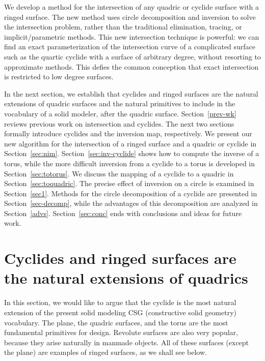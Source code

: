 We develop a method for the intersection of any quadric or cyclide surface
with a ringed surface.
The new method uses circle decomposition and inversion to solve the 
intersection problem, rather than the traditional elimination, tracing, or
implicit/parametric methods.
This new intersection technique is powerful: 
we can find an exact parameterization of the intersection curve of a
complicated surface such as the quartic cyclide 
with a surface of arbitrary degree, without resorting to approximate methods.
This defies the common conception that exact intersection is restricted to 
low degree surfaces.

In the next section, we establish that cyclides and ringed surfaces 
are the natural extensions of quadric surfaces and the natural primitives 
to include in the vocabulary of a solid modeler, after the quadric surface.
Section~\ref{prev-wk} reviews previous work on intersection and cyclides.
The next two sections formally introduce cyclides and the inversion map, 
respectively.
We present our new algorithm for the intersection of a ringed surface and 
a quadric or cyclide in Section~\ref{sec:nim}.
Section~\ref{sec:inv-cyclide} shows how to compute the inverse of a torus,
while the more difficult inversion from a cyclide to a torus is developed
in Section~\ref{sec:totorus}.
We discuss the mapping of a cyclide to a quadric in 
Section~\ref{sec:toquadric}.
The precise effect of inversion on a circle is examined in Section~\ref{sec1}.
Methods for the circle decomposition of a cyclide are presented in
Section~\ref{sec-decomp}, while the advantages of this decomposition 
are analyzed in Section~\ref{advs}.
Section~\ref{sec:conc} ends with conclusions and ideas for future work.

\section{Cyclides and ringed surfaces are the natural extensions of quadrics}

In this section, we would like to argue that the 
cyclide is the most natural extension of the present solid modeling
CSG (constructive solid geometry) vocabulary.
The plane, the quadric surfaces, and the torus are the most fundamental
primitives for design.
Revolute surfaces are also very popular, because they arise naturally
in manmade objects.
All of these surfaces (except the plane) are examples of ringed surfaces, 
as we shall see below.

